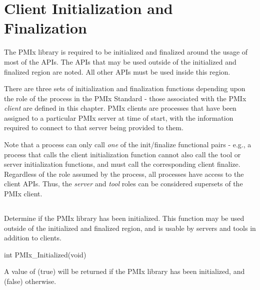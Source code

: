 \chapter{Client Initialization and Finalization}
\label{chap:api_init}

The \ac{PMIx} library is required to be initialized and finalized around the usage of most of the \acp{API}.
The \acp{API} that may be used outside of the initialized and finalized region are noted.
All other \acp{API} must be used inside this region.

There are three sets of initialization and finalization functions depending upon the role of the process in the \ac{PMIx} Standard - those associated with the \ac{PMIx} \emph{client} are defined in this chapter. \ac{PMIx} clients are processes that have been assigned to a particular \ac{PMIx} server at time of start, with the information required to connect to that server being provided to them.

Note that a process can only call \textit{one} of the init/finalize functional pairs - e.g., a process that calls the client initialization function cannot also call the tool or server initialization functions, and must call the corresponding client finalize. Regardless of the role assumed by the process, all processes have access to the client \acp{API}. Thus, the \emph{server} and \emph{tool} roles can be considered supersets of the \ac{PMIx} client.

\section{}

\summary

Determine if the \ac{PMIx} library has been initialized. This function may be used outside of the initialized and finalized region, and is usable by servers and tools in addition to clients.

\format

\cspecificstart
\begin{codepar}
int PMIx_Initialized(void)
\end{codepar}
\cspecificend

A value of  (true) will be returned if the \ac{PMIx} library has been initialized, and  (false) otherwise.

